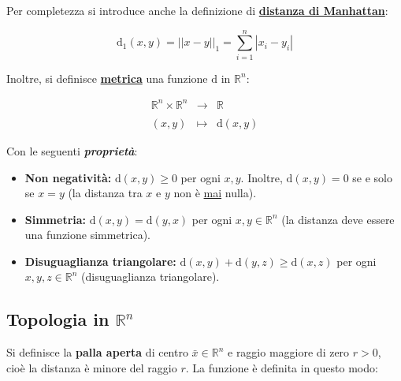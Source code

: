 \documentclass[a4paper]{article}
\begin{document}
	\noindent
	Per completezza si introduce anche la definizione di \textbf{\underline{distanza di Manhattan}}:
	
	\begin{equation}\label{distanza di Manhattan}
		\mathrm{d}_{1}\left(x,y\right) = \Big||x-y|\Big|_{1} = \sum_{i = 1}^{n} |x_{i} - y_{i}|
	\end{equation}

	\noindent
	Inoltre, si definisce \textbf{\underline{metrica}} una funzione $\mathrm{d}$ in $\mathbb{R}^{n}$:
	
	\begin{equation}\label{metrica}
		\begin{array}{lll}
			\mathbb{R}^{n} \times \mathbb{R}^{n} & \longrightarrow & \mathbb{R} \\
			&& \\
			\left(x,y\right)					 & \longmapsto	   & \mathrm{d}\left(x,y\right)
		\end{array}
	\end{equation}

	\noindent
	Con le seguenti \textbf{\emph{proprietà}}:
	
	\begin{itemize}
		\item \textbf{Non negatività:} $\mathrm{d}\left(x,y\right) \ge 0$ per ogni $x,y$. Inoltre, $\mathrm{d}\left(x,y\right) = 0$ se e solo se $x = y$ (la distanza tra $x$ e $y$ non è \underline{mai} nulla).
		
		\item \textbf{Simmetria:} $\mathrm{d}\left(x,y\right) = \mathrm{d}\left(y,x\right)$ per ogni $x,y\in\mathbb{R}^{n}$ (la distanza deve essere una funzione simmetrica).
		
		\item \textbf{Disuguaglianza triangolare:} $\mathrm{d}\left(x,y\right) + \mathrm{d}\left(y,z\right) \ge \mathrm{d}\left(x,z\right)$ per ogni $x,y,z \in \mathbb{R}^{n}$ (disuguaglianza triangolare).
	\end{itemize}

	\newpage
	
	\subsection{Topologia in $\mathbb{R}^{n}$}
	
	Si definisce la \textbf{palla aperta} di centro $\bar{x}\in\mathbb{R}^{n}$ e raggio maggiore di zero $r > 0$, cioè la distanza è minore del raggio $r$. La funzione è definita in questo modo:
	
\end{document}
